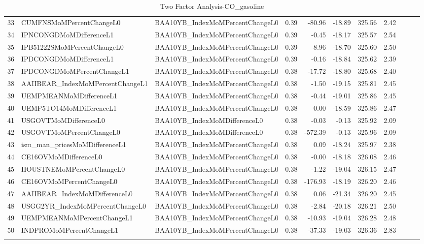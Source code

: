 \begin{longtable}{rllrrrrrlll}
  33 & CUMFNSMoMPercentChangeL0 & BAA10YB\_IndexMoMPercentChangeL0 & 0.39 & -80.96 & -18.89 & 325.56 & 2.42 &  &  &  \\ 
  34 & IPNCONGDMoMDifferenceL1 & BAA10YB\_IndexMoMPercentChangeL0 & 0.39 & -0.45 & -18.17 & 325.57 & 2.54 &  &  &  \\ 
  35 & IPB51222SMoMPercentChangeL0 & BAA10YB\_IndexMoMPercentChangeL0 & 0.39 & 8.96 & -18.70 & 325.60 & 2.50 &  &  &  \\ 
  36 & IPDCONGDMoMDifferenceL1 & BAA10YB\_IndexMoMPercentChangeL0 & 0.39 & -0.16 & -18.84 & 325.62 & 2.39 &  &  &  \\ 
  37 & IPDCONGDMoMPercentChangeL1 & BAA10YB\_IndexMoMPercentChangeL0 & 0.38 & -17.72 & -18.80 & 325.68 & 2.40 &  &  &  \\ 
  38 & AAIIBEAR\_IndexMoMPercentChangeL1 & BAA10YB\_IndexMoMPercentChangeL0 & 0.38 & -1.50 & -19.15 & 325.81 & 2.45 &  &  &  \\ 
  39 & UEMPMEANMoMDifferenceL1 & BAA10YB\_IndexMoMPercentChangeL0 & 0.38 & -0.44 & -19.01 & 325.86 & 2.45 &  &  &  \\ 
  40 & UEMP5TO14MoMDifferenceL1 & BAA10YB\_IndexMoMPercentChangeL0 & 0.38 & 0.00 & -18.59 & 325.86 & 2.47 &  &  &  \\ 
  41 & USGOVTMoMDifferenceL0 & BAA10YB\_IndexMoMDifferenceL0 & 0.38 & -0.03 & -0.13 & 325.92 & 2.09 &  &  &  \\ 
  42 & USGOVTMoMPercentChangeL0 & BAA10YB\_IndexMoMDifferenceL0 & 0.38 & -572.39 & -0.13 & 325.96 & 2.09 &  &  &  \\ 
  43 & ism\_man\_pricesMoMDifferenceL1 & BAA10YB\_IndexMoMPercentChangeL0 & 0.38 & 0.09 & -18.24 & 325.97 & 2.38 &  &  &  \\ 
  44 & CE16OVMoMDifferenceL0 & BAA10YB\_IndexMoMPercentChangeL0 & 0.38 & -0.00 & -18.18 & 326.08 & 2.46 &  &  &  \\ 
  45 & HOUSTNEMoMPercentChangeL0 & BAA10YB\_IndexMoMPercentChangeL0 & 0.38 & -1.22 & -19.04 & 326.15 & 2.47 &  &  &  \\ 
  46 & CE16OVMoMPercentChangeL0 & BAA10YB\_IndexMoMPercentChangeL0 & 0.38 & -176.93 & -18.19 & 326.20 & 2.46 &  &  &  \\ 
  47 & AAIIBEAR\_IndexMoMDifferenceL0 & BAA10YB\_IndexMoMPercentChangeL0 & 0.38 & 0.06 & -21.34 & 326.20 & 2.45 &  &  &  \\ 
  48 & USGG2YR\_IndexMoMPercentChangeL0 & BAA10YB\_IndexMoMPercentChangeL0 & 0.38 & -2.84 & -20.18 & 326.21 & 2.50 &  &  &  \\ 
  49 & UEMPMEANMoMPercentChangeL1 & BAA10YB\_IndexMoMPercentChangeL0 & 0.38 & -10.93 & -19.04 & 326.28 & 2.48 &  &  &  \\ 
  50 & INDPROMoMPercentChangeL1 & BAA10YB\_IndexMoMPercentChangeL0 & 0.38 & -37.33 & -19.03 & 326.36 & 2.83 &  &  &  \\ 
   \hline
\hline
\caption{Two Factor Analysis-CO_gasoline} 
\end{longtable}
